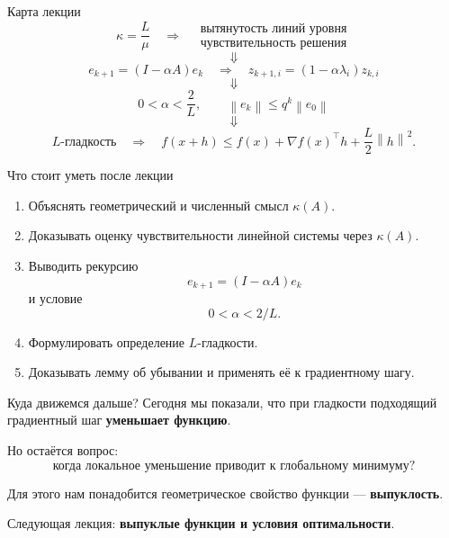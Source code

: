 \documentclass[aspectratio=169,10pt]{beamer}
\newcommand{\norm}[1]{\left\lVert #1\right\rVert}
\newcommand{\grad}{\nabla}
\begin{document}
\begin{frame}{Карта лекции}
\footnotesize
\[
 \boxed{\kappa=\frac{L}{\mu}}
 \quad\Longrightarrow\quad
 \begin{array}{c}
 \text{вытянутость линий уровня}\\
 \text{чувствительность решения}
 \end{array}
\]
\[
 \Downarrow
\]
\[
 e_{k+1}=(I-\alpha A)e_k
 \quad\Longrightarrow\quad
 z_{k+1,i}=(1-\alpha\lambda_i)z_{k,i}
\]
\[
 \Downarrow
\]
\[
 0<\alpha<\frac2L,
 \qquad
 \norm{e_k}\le q^k\norm{e_0}
\]
\[
 \Downarrow
\]
\[
 \text{$L$-гладкость}
 \quad\Longrightarrow\quad
 f(x+h)\le f(x)+\grad f(x)^\top h+\frac L2\norm h^2.
\]
\end{frame}

\begin{frame}{Что стоит уметь после лекции}
\small
\begin{enumerate}
 \item Объяснять геометрический и численный смысл $\kappa(A)$.
 \item Доказывать оценку чувствительности линейной системы через $\kappa(A)$.
 \item Выводить рекурсию
 \[
 e_{k+1}=(I-\alpha A)e_k
 \]
 и условие
 \[
 0<\alpha<2/L.
 \]
 \item Формулировать определение $L$-гладкости.
 \item Доказывать лемму об убывании и применять её к градиентному шагу.
\end{enumerate}
\end{frame}

\begin{frame}{Куда движемся дальше?}
\small
Сегодня мы показали, что при гладкости подходящий градиентный шаг \textbf{уменьшает функцию}.

Но остаётся вопрос:
\[
 \boxed{
 \text{когда локальное уменьшение приводит к глобальному минимуму?}
 }
\]

Для этого нам понадобится геометрическое свойство функции --- \textbf{выпуклость}.

\vspace{0.5em}
Следующая лекция: \textbf{выпуклые функции и условия оптимальности}.
\end{frame}
\end{document}
